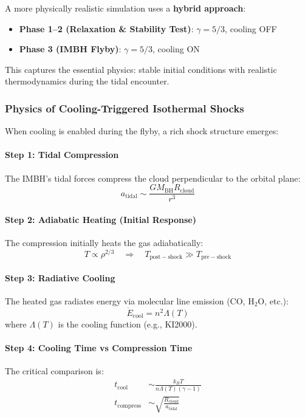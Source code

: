 \documentclass[11pt,a4paper]{article}
\begin{document}
A more physically realistic simulation uses a \textbf{hybrid approach}:
\begin{itemize}
    \item \textbf{Phase 1--2 (Relaxation \& Stability Test)}: $\gamma = 5/3$, cooling OFF
    \item \textbf{Phase 3 (IMBH Flyby)}: $\gamma = 5/3$, cooling ON
\end{itemize}

This captures the essential physics: stable initial conditions with realistic
thermodynamics during the tidal encounter.

\subsubsection{Physics of Cooling-Triggered Isothermal Shocks}

When cooling is enabled during the flyby, a rich shock structure emerges:

\paragraph{Step 1: Tidal Compression}
The IMBH's tidal forces compress the cloud perpendicular to the orbital plane:
\begin{equation}
    a_\mathrm{tidal} \sim \frac{G M_\mathrm{BH} R_\mathrm{cloud}}{r^3}
\end{equation}

\paragraph{Step 2: Adiabatic Heating (Initial Response)}
The compression initially heats the gas adiabatically:
\begin{equation}
    T \propto \rho^{2/3} \quad \Rightarrow \quad T_\mathrm{post-shock} \gg T_\mathrm{pre-shock}
\end{equation}

\paragraph{Step 3: Radiative Cooling}
The heated gas radiates energy via molecular line emission (CO, H$_2$O, etc.):
\begin{equation}
    \dot{E}_\mathrm{cool} = n^2 \Lambda(T)
\end{equation}
where $\Lambda(T)$ is the cooling function (e.g., KI2000).

\paragraph{Step 4: Cooling Time vs Compression Time}
The critical comparison is:
\begin{align}
    t_\mathrm{cool} &\sim \frac{k_B T}{n \Lambda(T) (\gamma - 1)} \\
    t_\mathrm{compress} &\sim \sqrt{\frac{R_\mathrm{cloud}}{a_\mathrm{tidal}}}
\end{align}
\end{document}
